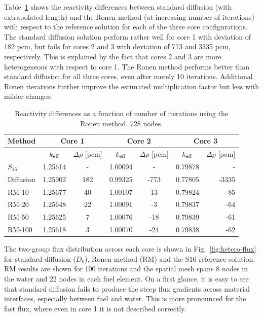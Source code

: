 Table~\ref{tab:dx_drho2} shows the reactivity differences between standard diffusion (with extrapolated length) and the Ronen method (at increasing number of iterations) with respect to the reference solution for each of the three core configurations. The standard diffusion solution perform rather well for core 1 with deviation of 182 pcm, but fails for cores 2 and 3 with deviation of 773 and 3335 pcm, respectively. This is explained by the fact that cores 2 and 3 are more heterogeneous with respect to core 1. The Ronen method performs better than standard diffusion for all three cores, even after merely 10 iterations. Additional Ronen iterations further improve the estimated multiplication factor but less with milder changes.      

\begin{table}[!htbp]
	\centering
	\caption{Reactivity differences as a function of number of iterations using the Ronen method. 728 nodes.}
	\label{tab:dx_drho2}
	\begin{tabular}{lcccccr}
		Method & \multicolumn{2}{c}{Core 1} & \multicolumn{2}{c}{Core 2} & \multicolumn{2}{c}{Core 3}  \\ 
		\midrule
		{}				& ${k_{\textrm{\scriptsize{eff}}}}$& $\Delta\rho$ [pcm]& ${k_{\textrm{\scriptsize{eff}}}}$	&$\Delta\rho$ [pcm]& ${k_{\textrm{\scriptsize{eff}}}}$ &$\Delta\rho$ [pcm] \\
		$S_{16}$		&1.25614	&-			 &1.00094   &-				  &0.79878		&-		\\
		Diffusion		&1.25902	&182		 &0.99325	&-773			  &0.77805		&-3335	\\
		RM-10			&1.25677	&40			 &1.00107	&13			 	  &0.79824		&-85	\\
		RM-20			&1.25648	&22			 &1.00091	&-3			  	  &0.79837		&-64	\\
		RM-50			&1.25625	&7			 &1.00076	&-18			  &0.79839		&-61	\\
		RM-100			&1.25618	&3			 &1.00070	&-24			  &0.79838		&-62	\\		
	\end{tabular}
\end{table}

The two-group flux distribution across each core is shown in Fig.~\ref{fig:hetero-flux} for standard diffusion ($D_0$), Ronen method (RM) and the S16 reference solution. RM results are shown for 100 iterations and the spatial mesh spans 8 nodes in the water and 22 nodes in each fuel element. On a first glance, it is easy to see that standard diffusion fails to produce the steep flux gradients across material interfaces, especially between fuel and water. This is more pronounced for the fast flux, where even in core 1 it is not described correctly. 


